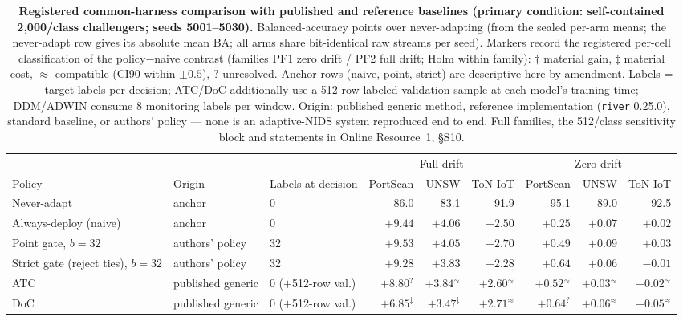 \begin{table}[t]
\centering
\caption{\textbf{Registered common-harness comparison with published and reference baselines
(primary condition: self-contained 2{,}000/class challengers; seeds 5001--5030).} Balanced-accuracy
points over never-adapting (from the sealed per-arm means; the never-adapt row gives its absolute
mean BA; all arms share bit-identical raw streams per seed). Markers record the registered per-cell classification of the policy$-$naive
contrast (families PF1 zero drift / PF2 full drift; Holm within family): $\dagger$ material
gain, $\ddagger$ material cost, $\approx$ compatible (CI90 within $\pm0.5$), $?$ unresolved.
Anchor rows (naive, point, strict) are descriptive here by amendment. Labels = target labels
per decision; ATC/DoC additionally use a 512-row labeled validation sample at each model's
training time; DDM/ADWIN consume 8 monitoring labels per window. Origin: published generic
method, reference implementation (\texttt{river} 0.25.0), standard baseline, or authors'
policy --- none is an adaptive-NIDS system reproduced end to end. Full families, the 512/class
sensitivity block and statements in Online Resource~1, \S S10.}
\label{tab:common_harness}
\scriptsize
\setlength{\tabcolsep}{2pt}
\renewcommand{\arraystretch}{1.08}
\begin{tabular}{l l l r r r r r r}
\toprule
 & & & \multicolumn{3}{c}{Full drift} & \multicolumn{3}{c}{Zero drift} \\
\cmidrule(lr){4-6}\cmidrule(lr){7-9}
Policy & Origin & Labels at decision & PortScan & UNSW & ToN-IoT & PortScan & UNSW & ToN-IoT \\
\midrule
Never-adapt & anchor & 0 & 86.0 & 83.1 & 91.9 & 95.1 & 89.0 & 92.5 \\
Always-deploy (naive) & anchor & 0 & $+9.44$ & $+4.06$ & $+2.50$ & $+0.25$ & $+0.07$ & $+0.02$ \\
Point gate, $b{=}32$ & authors' policy & 32 & $+9.53$ & $+4.05$ & $+2.70$ & $+0.49$ & $+0.09$ & $+0.03$ \\
Strict gate (reject ties), $b{=}32$ & authors' policy & 32 & $+9.28$ & $+3.83$ & $+2.28$ & $+0.64$ & $+0.06$ & $-0.01$ \\
ATC \cite{garg2022atc} & published generic & 0 ($+$512-row val.) & $+8.80$$^{?}$ & $+3.84$$^{\approx}$ & $+2.60$$^{\approx}$ & $+0.52$$^{\approx}$ & $+0.03$$^{\approx}$ & $+0.02$$^{\approx}$ \\
DoC \cite{guillory2021doc} & published generic & 0 ($+$512-row val.) & $+6.85$$^{\ddagger}$ & $+3.47$$^{\ddagger}$ & $+2.71$$^{\approx}$ & $+0.64$$^{?}$ & $+0.06$$^{\approx}$ & $+0.05$$^{\approx}$ \\

\end{tabular}
\end{table}
